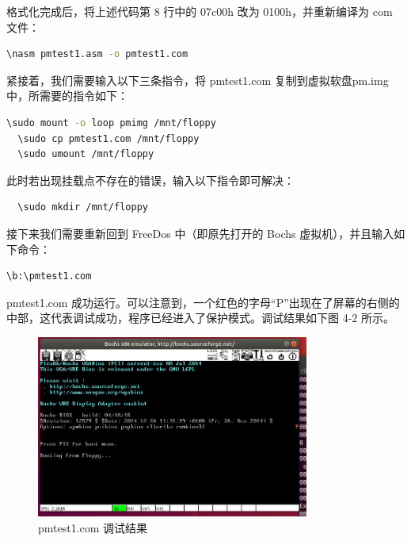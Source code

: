 格式化完成后，将上述代码第 8 行中的 07c00h 改为 0100h，并重新编译为 com 文件：
\begin{lstlisting}[language = bash]
  \nasm pmtest1.asm -o pmtest1.com
\end{lstlisting}
紧接着，我们需要输入以下三条指令，将 pmtest1.com 复制到虚拟软盘pm.img 中，所需要的指令如下：
\begin{lstlisting}[language = bash]
  \sudo mount -o loop pmimg /mnt/floppy
  \sudo cp pmtest1.com /mnt/floppy
  \sudo umount /mnt/floppy
\end{lstlisting}
此时若出现挂载点不存在的错误，输入以下指令即可解决：
\begin{lstlisting}
  \sudo mkdir /mnt/floppy
\end{lstlisting}
接下来我们需要重新回到 FreeDos 中（即原先打开的 Bochs 虚拟机），并且输入如下命令：
\begin{lstlisting}[language = bash]
  \b:\pmtest1.com
\end{lstlisting}
pmtest1.com 成功运行。可以注意到，一个红色的字母“P”出现在了屏幕的右侧的中部，这代表调试成功，程序已经进入了保护模式。调试结果如下图 4-2 所示。
\begin{figure}[H]
  \centering
  \includegraphics[width=0.8\textwidth]{figures/chapter4/4-2.jpg}
  \caption{pmtest1.com 调试结果}
  \label{fig:2}
\end{figure}

